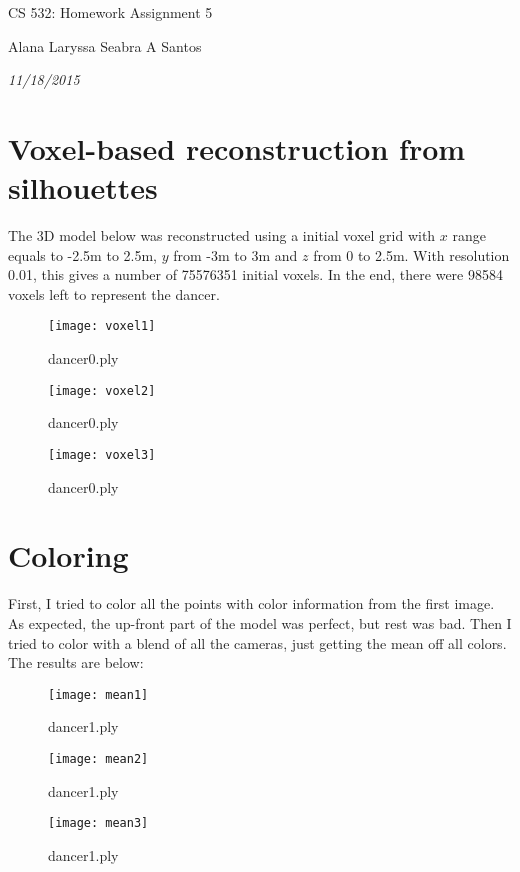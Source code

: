 \documentclass{article}
\begin{document}
\centerline{\sc \large CS 532: Homework Assignment 5}
\vspace{.3pc}
\centerline{Alana Laryssa Seabra A Santos}
\centerline{\it 11/18/2015}
\vspace{.6pc}

\section{Voxel-based reconstruction from silhouettes}

The 3D model below was reconstructed using a initial voxel grid with $x$ range equals to -2.5m to 2.5m, $y$ from -3m to 3m and $z$ from 0 to 2.5m. With resolution 0.01, this gives a number of 75576351 initial voxels. In the end, there were 98584 voxels left to represent the dancer.

\begin{figure}[H]
  \caption{dancer0.ply}
  \centering
    \texttt{[image: voxel1]}
\end{figure}

\begin{figure}[H]
  \caption{dancer0.ply}
  \centering
    \texttt{[image: voxel2]}
\end{figure}

\begin{figure}[H]
  \caption{dancer0.ply}
  \centering
    \texttt{[image: voxel3]}
\end{figure}

\section{Coloring}

First, I tried to color all the points with color information from the first image. As expected, the up-front part of the model was perfect, but rest was bad. Then I tried to color with a blend of all the cameras, just getting the mean off all colors. The results are below:

\begin{figure}[H]
  \caption{dancer1.ply}
  \centering
    \texttt{[image: mean1]}
\end{figure}

\begin{figure}[H]
  \caption{dancer1.ply}
  \centering
    \texttt{[image: mean2]}
\end{figure}

\begin{figure}[H]
  \caption{dancer1.ply}
  \centering
    \texttt{[image: mean3]}
\end{figure}
\end{document}
